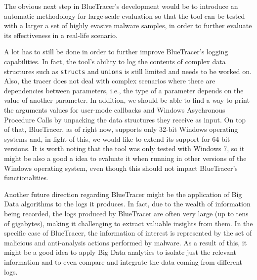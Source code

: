 The obvious next step in BlueTracer's development would be to introduce an automatic methodology for large-scale evaluation so that the tool can be tested with a larger a set of highly evasive malware samples, in order to further evaluate its effectiveness in a real-life scenario.

A lot has to still be done in order to further improve BlueTracer's logging capabilities. In fact, the tool's ability to log the contents of complex data structures such as \texttt{structs} and \texttt{unions} is still limited and needs to be worked on. Also, the tracer does not deal with complex scenarios where there are dependencies between parameters, i.e., the type of a parameter depends on the value of another parameter. In addition, we should be able to find a way to print the arguments values for user-mode callbacks and Windows Asychronous Procedure Calls by unpacking the data structures they receive as input. On top of that, BlueTracer, as of right now, supports only 32-bit Windows operating systems and, in light of this, we would like to extend its support for 64-bit versions. It is worth noting that the tool was only tested with Windows 7, so it might be also a good a idea to evaluate it when running in other versions of the Windows operating system, even though this should not impact BlueTracer's functionalities.

Another future direction regarding BlueTracer might be the application of Big Data algorithms to the logs it produces. In fact, due to the wealth of information being recorded, the logs produced by BlueTracer are often very large (up to tens of gigabytes), making it challenging to extract valuable insights from them. In the specific case of BlueTracer, the information of interest is represented by the set of malicious and anti-analysis actions performed by malware. As a result of this, it might be a good idea to apply Big Data analytics to isolate just the relevant information and to even compare and integrate the data coming from different logs.%

\iffalse
Two areas:
\begin{enumerate}
\item Tools capabilities: support for struct, compatibility extension, more malwares tested
\item Data Analysis Techniques: data analysis for threat intelligence to analyze the logs.
\end{enumerate}
\fi